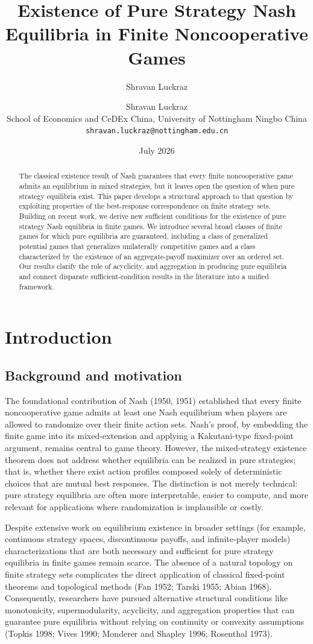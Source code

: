 \documentclass[11pt]{article}
\title{Existence of Pure Strategy Nash Equilibria in Finite Noncooperative Games}
\author{Shravan Luckraz}
\author{Shravan Luckraz\\
School of Economics and CeDEx China, University of Nottingham Ningbo China\\
\texttt{shravan.luckraz@nottingham.edu.cn}}
\date{July 2026}
\begin{document}
\maketitle

\begin{abstract}
The classical existence result of Nash guarantees that every finite noncooperative game admits an equilibrium in mixed strategies, but it leaves open the question of when pure strategy equilibria exist. This paper develops a structural approach to that question by exploiting properties of the best-response correspondence on finite strategy sets. Building on recent work, we derive new sufficient conditions for the existence of pure strategy Nash equilibria in finite games. We introduce several broad classes of finite games for which pure equilibria are guaranteed, including a class of generalized potential games that generalizes unilaterally competitive games and a class characterized by the existence of an aggregate-payoff maximizer over an ordered set. Our results clarify the role of  acyclicity, and aggregation in producing pure equilibria and connect disparate sufficient-condition results in the literature into a unified framework.
\end{abstract}

\section{Introduction}

\subsection{Background and motivation}
The foundational contribution of Nash (1950, 1951) established that every finite noncooperative game admits at least one Nash equilibrium when players are allowed to randomize over their finite action sets. Nash's proof, by embedding the finite game into its mixed-extension and applying a Kakutani-type fixed-point argument, remains central to game theory. However, the mixed-strategy existence theorem does not address whether equilibria can be realized in pure strategies; that is, whether there exist action profiles composed solely of deterministic choices that are mutual best responses. The distinction is not merely technical: pure strategy equilibria are often more interpretable, easier to compute, and more relevant for applications where randomization is implausible or costly.

Despite extensive work on equilibrium existence in broader settings (for example, continuous strategy spaces, discontinuous payoffs, and infinite-player models) characterizations that are both necessary and sufficient for pure strategy equilibria in finite games remain scarce. The absence of a natural topology on finite strategy sets complicates the direct application of classical fixed-point theorems and topological methods (Fan 1952; Tarski 1955; Abian 1968). Consequently, researchers have pursued alternative structural conditions like monotonicity, supermodularity, acyclicity, and aggregation properties that can guarantee pure equilibria without relying on continuity or convexity assumptions (Topkis 1998; Vives 1990; Monderer and Shapley 1996; Rosenthal 1973).
\end{document}
